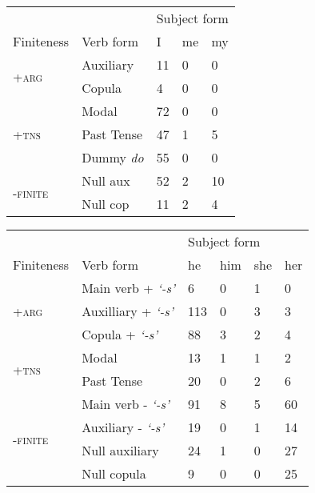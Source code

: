 \begin{table}[!h]
\begin{minipage}[t]{0.5\textwidth}
\begin{tabular}{lllll}
    \toprule
 &  & \multicolumn{3}{l}{Subject form} \\ \cline{3-5} 
Finiteness & Verb form & I & me & my \\ \hline
\multirow{2}{*}{\textsc{+arg}} & Auxiliary & 11 & 0 & 0 \\
 & Copula & 4 & 0 & 0 \\ \hline
\multirow{3}{*}{\textsc{+tns}} & Modal & 72 & 0 & 0 \\
 & Past Tense & 47 & 1 & 5 \\
 & Dummy \textit{do} & 55 & 0 & 0 \\ \hline
\multirow{2}{*}{\textsc{-finite}} & Null aux & 52 & 2 & 10 \\
 & Null cop & 11 & 2 & 4\\
\bottomrule
\end{tabular}
\end{minipage}
\vspace{1ex}
\begin{minipage}[t]{0.5\textwidth}
    \centering
    \small
\begin{tabular}{llllll}
\toprule
 &  & \multicolumn{4}{l}{Subject form} \\ \cline{3-6} 
Finiteness & Verb form & he & him & she & her \\ \hline
\multirow{3}{*}{\textsc{+arg}} & Main verb + \textit{`-s'} & 6 & 0 & 1 & 0 \\
 & Auxilliary + \textit{`-s'} & 113 & 0 & 3 & 3 \\
 & Copula + \textit{`-s'} & 88 & 3 & 2 & 4 \\ \hline
\multirow{2}{*}{\textsc{+tns}} & Modal & 13 & 1 & 1 & 2 \\
 & Past Tense & 20 & 0 & 2 & 6 \\ \hline
\multirow{4}{*}{\textsc{-finite}} & Main verb - \textit{`-s'} & 91 & 8 & 5 & 60 \\
 & Auxiliary - \textit{`-s'} & 19 & 0 & 1 & 14 \\
 & Null auxiliary & 24 & 1 & 0 & 27 \\
 & Null copula & 9 & 0 & 0 & 25\\
 \bottomrule
\end{tabular}
\end{minipage}
\vspace{1ex}
   \begin{minipage}[t]{0.5\textwidth}
    \centering
    \small
    \begin{tabular}{@{}lll@{}}

\end{tabular}
\end{minipage}
\end{table}
